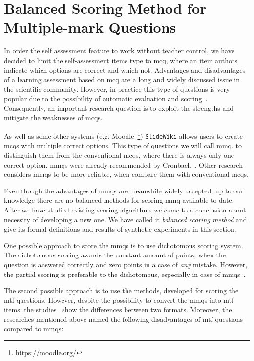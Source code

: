 \documentclass[PhD, Submit, ngerman,UKenglish,table]{scrbook}
\begin{document}
\section{Balanced Scoring Method for Multiple-mark Questions}

In order the self assessment feature to work without teacher control, we have decided to limit the self-assessment items type to \gls{mcq}, where an item authors indicate which options are correct and which not. 
Advantages and disadvantages of a learning assessment based on \gls{mcq} are a long and widely discussed issue in the scientific community.
However, in practice this type of questions is very popular due to the possibility of automatic evaluation and scoring~\cite{Farthing1998}.
Consequently, an important research question is to exploit the strengths and mitigate the weaknesses of \gls{mcq}s.

As well as some other systems (e.g. Moodle~\footnote{\url{https://moodle.org/}}) \texttt{SlideWiki} allows users to create \gls{mcq}s with multiple correct options.
This type of questions we will call \gls{mmq}, to distinguish them from the conventional \gls{mcq}s, where there is always only one correct option.
\gls{mmq}s were already recommended by Cronbach~\cite{Cronbach}.
Other research~\cite{Ripkey1996,Pomplun1997,Hohensinn2011} considers \gls{mmq}s to be more reliable, when compare them with conventional \gls{mcq}s.

Even though the advantages of \gls{mmq}s are meanwhile widely accepted, up to our knowledge there are no balanced methods for scoring \gls{mmq} available to date.
After we have studied existing scoring algorithms we came to a conclusion about necessity of developing a new one.
We have called it \emph{balanced scoring method} and give its formal definitions and results of synthetic experiments in this section.

One possible approach to score the \gls{mmq}s is to use dichotomous scoring system. 
The dichotomous scoring awards the constant amount of points, when the question is answered correctly and zero points in a case of \textit{any} mistake.
However, the partial scoring is preferable to the dichotomous, especially in case of \gls{mmq}s~\cite{Ripkey1996,Jiao2012,Bauer2011,Ben-Simon1997}. 

The second possible approach is to use the methods, developed for scoring the \gls{mtf} questions.
However, despite the possibility to convert the \gls{mmq}s into \gls{mtf} items, the studies~\cite{Cronbach,Dressel1953} show the differences between two formats.
Moreover, the researches mentioned above named the following disadvantages of \gls{mtf} questions compared to \gls{mmq}s:
\end{document}
